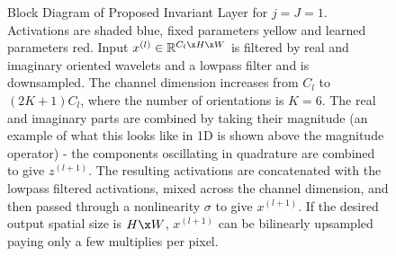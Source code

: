 \begin{figure}[t!]
{

  }
  \caption{Block Diagram of Proposed Invariant Layer for $j=J=1$. Activations are shaded
  blue, fixed parameters yellow and learned parameters red. Input
  $x^{(l)}\in \mathbb{R}^{C_l\x H\x W}$ is filtered by real and imaginary oriented
  wavelets and a lowpass filter and is downsampled. The channel dimension
  increases from $C_l$ to $(2K+1)C_l$, where the number of orientations is $K=6$.
  The real and imaginary parts are combined by taking their magnitude (an
  example of what this looks like in 1D is shown above the magnitude operator) -
  the components oscillating in quadrature are combined to give $z^{(l+1)}$. The
  resulting activations are concatenated with the lowpass filtered activations,
  mixed across the channel dimension, and then passed through a nonlinearity
  $\sigma$ to give $x^{(l+1)}$.  If the desired output spatial size is $H\x W$,
  $x^{(l+1)}$ can be bilinearly upsampled paying only a few multiplies per
  pixel.}
  \label{fig:ch5:block_diagram}
\end{figure}

